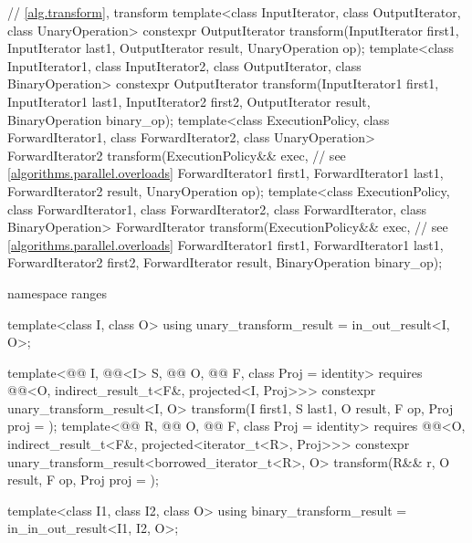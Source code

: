 \begin{codeblock}
{  // \ref{alg.transform}, transform
  template<class InputIterator, class OutputIterator, class UnaryOperation>
    constexpr OutputIterator
      transform(InputIterator first1, InputIterator last1,
                OutputIterator result, UnaryOperation op);
  template<class InputIterator1, class InputIterator2, class OutputIterator,
           class BinaryOperation>
    constexpr OutputIterator
      transform(InputIterator1 first1, InputIterator1 last1,
                InputIterator2 first2, OutputIterator result,
                BinaryOperation binary_op);
  template<class ExecutionPolicy, class ForwardIterator1, class ForwardIterator2,
           class UnaryOperation>
    ForwardIterator2
      transform(ExecutionPolicy&& exec,                         // see \ref{algorithms.parallel.overloads}
                ForwardIterator1 first1, ForwardIterator1 last1,
                ForwardIterator2 result, UnaryOperation op);
  template<class ExecutionPolicy, class ForwardIterator1, class ForwardIterator2,
           class ForwardIterator, class BinaryOperation>
    ForwardIterator
      transform(ExecutionPolicy&& exec,                         // see \ref{algorithms.parallel.overloads}
                ForwardIterator1 first1, ForwardIterator1 last1,
                ForwardIterator2 first2, ForwardIterator result,
                BinaryOperation binary_op);

  namespace ranges {
    template<class I, class O>
      using unary_transform_result = in_out_result<I, O>;

    template<@@ I, @@<I> S, @@ O,
             @@ F, class Proj = identity>
      requires @@<O, indirect_result_t<F&, projected<I, Proj>>>
      constexpr unary_transform_result<I, O>
        transform(I first1, S last1, O result, F op, Proj proj = {});
    template<@@ R, @@ O, @@ F,
             class Proj = identity>
      requires @@<O, indirect_result_t<F&, projected<iterator_t<R>, Proj>>>
      constexpr unary_transform_result<borrowed_iterator_t<R>, O>
        transform(R&& r, O result, F op, Proj proj = {});

    template<class I1, class I2, class O>
      using binary_transform_result = in_in_out_result<I1, I2, O>;

}}
\end{codeblock}
